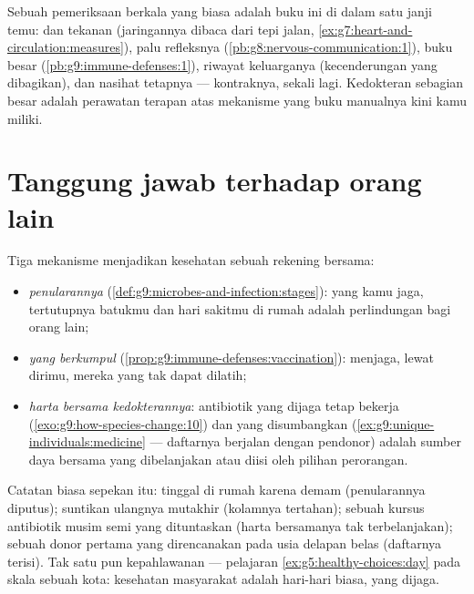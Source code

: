 \begin{example}\label{ex:g9:our-responsibility:checkup}
Sebuah pemeriksaan berkala yang biasa adalah buku ini di
dalam satu janji temu:  dan tekanan 
(jaringannya dibaca dari tepi jalan,
\cref{ex:g7:heart-and-circulation:measures}), palu
refleksnya (\cref{pb:g8:nervous-communication:1}), buku
besar  (\cref{pb:g9:immune-defenses:1}), riwayat
keluarganya (kecenderungan yang dibagikan), dan nasihat
tetapnya --- kontraknya, sekali lagi. Kedokteran sebagian
besar adalah perawatan terapan atas mekanisme yang buku
manualnya kini kamu miliki.
\end{example}

\section{Tanggung jawab terhadap orang lain}

\begin{proposition}\label{prop:g9:our-responsibility:others}
Tiga mekanisme menjadikan kesehatan sebuah rekening bersama:
\begin{itemize}
  \item \emph{penularannya}
        (\cref{def:g9:microbes-and-infection:stages}):
         yang kamu jaga, tertutupnya batukmu dan
        hari sakitmu di rumah adalah perlindungan bagi orang lain;
  \item \emph{ yang berkumpul}
        (\cref{prop:g9:immune-defenses:vaccination}):
         menjaga, lewat dirimu, mereka yang tak
        dapat dilatih;
  \item \emph{harta bersama kedokterannya}: antibiotik yang
        dijaga tetap bekerja
        (\cref{exo:g9:how-species-change:10}) dan  yang
        disumbangkan (\cref{ex:g9:unique-individuals:medicine}
        --- daftarnya berjalan dengan pendonor) adalah sumber
        daya bersama yang dibelanjakan atau diisi oleh
        pilihan perorangan.
\end{itemize}
\end{proposition}
\admitted

\begin{example}\label{ex:g9:our-responsibility:account}
Catatan biasa sepekan itu: tinggal di rumah karena demam
(penularannya diputus); suntikan ulangnya mutakhir (kolamnya
tertahan); sebuah kursus antibiotik musim semi yang
dituntaskan (harta bersamanya tak terbelanjakan); sebuah
donor  pertama yang direncanakan pada usia delapan
belas (daftarnya terisi). Tak satu pun kepahlawanan ---
pelajaran \cref{ex:g5:healthy-choices:day} pada skala sebuah
kota: kesehatan masyarakat adalah hari-hari biasa, yang dijaga.
\end{example}

